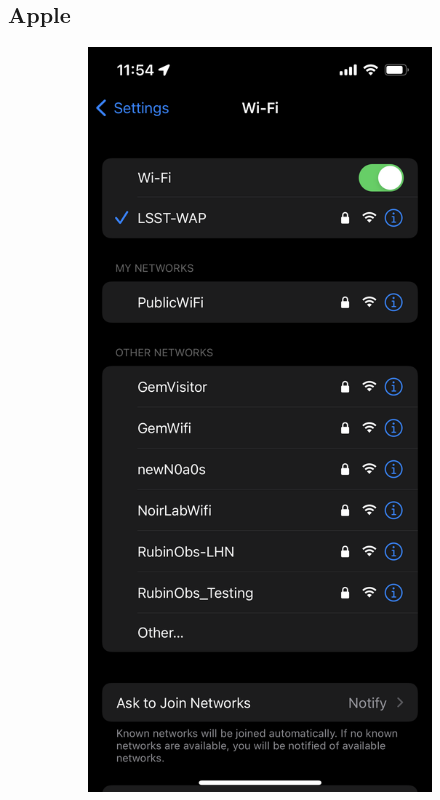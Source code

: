   \subsection{Apple}
  \begin{figure}
    \centering
    \begin{subfigure}{0.30\textwidth}
      \includegraphics[width=\textwidth]{Images/ios1.png}

\end{subfigure}
\end{figure}

